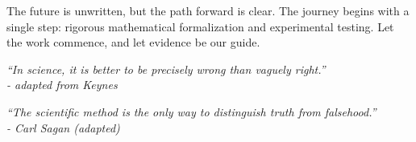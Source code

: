 The future is unwritten, but the path forward is clear. The journey begins with a single step: rigorous mathematical formalization and experimental testing. Let the work commence, and let evidence be our guide.

\vspace{1cm}

\begin{center}
\textit{``In science, it is better to be precisely wrong than vaguely right.'' \\
- adapted from Keynes}

\vspace{0.5cm}

\textit{``The scientific method is the only way to distinguish truth from falsehood.'' \\
- Carl Sagan (adapted)}
\end{center}
